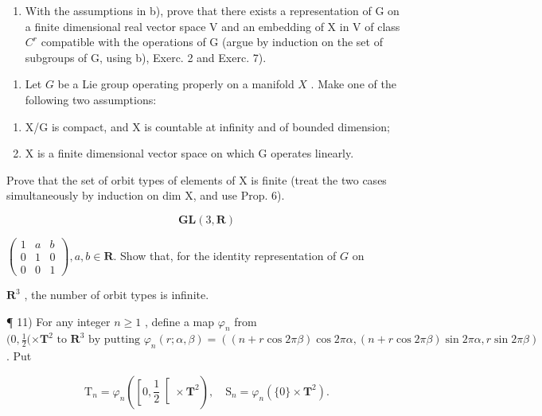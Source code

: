 \begin{enumerate}
\begin{enumerate}
\def\labelenumi{\alph{enumi})}
\setcounter{enumi}{2}
\tightlist
\item
  With the assumptions in b), prove that there exists a representation of G on a finite dimensional real vector space V and an embedding of X in V of class \(C^{r}\) compatible with the operations of G (argue by induction on the set of subgroups of G, using b), Exerc. 2 and Exerc. 7).
\end{enumerate}

\begin{enumerate}
\def\labelenumi{\arabic{enumi})}
\setcounter{enumi}{8}
\tightlist
\item
  Let \(G\) be a Lie group operating properly on a manifold \(X\) . Make one of the following two assumptions:
\end{enumerate}

\begin{enumerate}
\def\labelenumi{(\roman{enumi})}
\tightlist
\item
  X/G is compact, and X is countable at infinity and of bounded dimension;\\
\item
  X is a finite dimensional vector space on which G operates linearly.
\end{enumerate}

Prove that the set of orbit types of elements of X is finite (treat the two cases simultaneously by induction on dim X, and use Prop. 6).

\[
\mathbf {G L} (3, \mathbf {R})
\]

\(\left(\begin{array}{ccc}1 & a & b \\ 0 & 1 & 0 \\ 0 & 0 & 1\end{array}\right), a, b \in \mathbf{R}.\) Show that, for the identity representation of \(G\) on

\(\mathbf{R}^3\) , the number of orbit types is infinite.

\end{enumerate}
\relax{}
¶ 11) For any integer \(n \geq 1\) , define a map \(\varphi_n\) from \((0, \frac{1}{2} (\times \mathbf{T}^2 \text{ to } \mathbf{R}^3 \text{ by putting } \varphi_n(r; \alpha, \beta) = ((n + r \cos 2\pi\beta) \cos 2\pi\alpha, (n + r \cos 2\pi\beta) \sin 2\pi\alpha, r \sin 2\pi\beta)\) . Put

\[
\mathrm{T} _ {n} = \varphi_ {n} \left(\left[ 0, \frac {1}{2} \right[ \times \mathbf {T} ^ {2}\right), \quad \mathrm{S} _ {n} = \varphi_ {n} (\{0 \} \times \mathbf {T} ^ {2}).
\]

